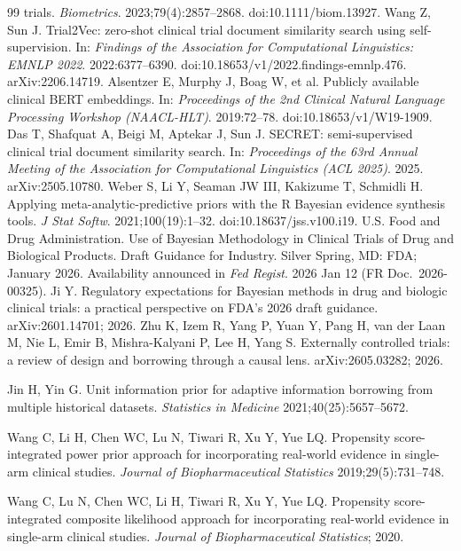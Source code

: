 \documentclass[11pt]{article}
\begin{document}
\begin{thebibliography}{99}
trials. \emph{Biometrics}. 2023;79(4):2857--2868. doi:10.1111/biom.13927.
 Wang Z, Sun J. Trial2Vec: zero-shot clinical trial document
similarity search using self-supervision. In: \emph{Findings of the Association
for Computational Linguistics: EMNLP 2022}. 2022:6377--6390.
doi:10.18653/v1/2022.findings-emnlp.476. arXiv:2206.14719.
 Alsentzer E, Murphy J, Boag W, et al. Publicly available
clinical BERT embeddings. In: \emph{Proceedings of the 2nd Clinical Natural
Language Processing Workshop (NAACL-HLT)}. 2019:72--78.
doi:10.18653/v1/W19-1909.
 Das T, Shafquat A, Beigi M, Aptekar J, Sun J. SECRET:
semi-supervised clinical trial document similarity search. In: \emph{Proceedings
of the 63rd Annual Meeting of the Association for Computational Linguistics
(ACL 2025)}. 2025. arXiv:2505.10780.
 Weber S, Li Y, Seaman JW III, Kakizume T, Schmidli H. Applying
meta-analytic-predictive priors with the R Bayesian evidence synthesis tools.
\emph{J Stat Softw}. 2021;100(19):1--32. doi:10.18637/jss.v100.i19.
 U.S. Food and Drug Administration. Use of Bayesian Methodology
in Clinical Trials of Drug and Biological Products. Draft Guidance for Industry.
Silver Spring, MD: FDA; January 2026. Availability announced in \emph{Fed
Regist}. 2026 Jan 12 (FR Doc.\ 2026-00325).
 Ji Y. Regulatory expectations for Bayesian methods in
drug and biologic clinical trials: a practical perspective on FDA's 2026 draft
guidance. arXiv:2601.14701; 2026.
 Zhu K, Izem R, Yang P, Yuan Y, Pang H, van der Laan M, Nie L,
Emir B, Mishra-Kalyani P, Lee H, Yang S. Externally controlled trials: a
review of design and borrowing through a causal lens. arXiv:2605.03282; 2026.

 Jin H, Yin G. Unit information prior for adaptive information
borrowing from multiple historical datasets. \emph{Statistics in Medicine}
2021;40(25):5657--5672.

 Wang C, Li H, Chen WC, Lu N, Tiwari R, Xu Y, Yue LQ.
Propensity score-integrated power prior approach for incorporating real-world
evidence in single-arm clinical studies. \emph{Journal of Biopharmaceutical
Statistics} 2019;29(5):731--748.

 Wang C, Lu N, Chen WC, Li H, Tiwari R, Xu Y, Yue LQ.
Propensity score-integrated composite likelihood approach for incorporating
real-world evidence in single-arm clinical studies. \emph{Journal of
Biopharmaceutical Statistics}; 2020.


\end{thebibliography}
\end{document}

